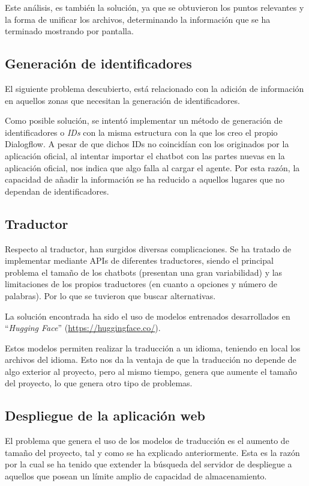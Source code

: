 Este análisis, es también la solución, ya que se obtuvieron los puntos relevantes y la forma de unificar los archivos, determinando la información que se ha terminado mostrando por pantalla.

\subsection{Generación de identificadores}
El siguiente problema descubierto, está relacionado con la adición de información en aquellos zonas que necesitan la generación de identificadores. 

Como posible solución, se intentó implementar un método de generación de identificadores o \textit{IDs} con la misma estructura con la que los creo el propio Dialogflow. A pesar de que dichos IDs no coincidían con los originados por la aplicación oficial, al intentar importar el chatbot con las partes nuevas en la aplicación oficial, nos indica que algo falla al cargar el agente. Por esta razón, la capacidad de añadir la información se ha reducido a aquellos lugares que no dependan de identificadores.

\subsection{Traductor}
Respecto al traductor, han surgidos diversas complicaciones. Se ha tratado de implementar mediante APIs de diferentes traductores, siendo el principal problema el tamaño de los chatbots (presentan una gran variabilidad) y las limitaciones de los propios traductores (en cuanto a opciones y número de palabras). Por lo que se tuvieron que buscar alternativas.

La solución encontrada ha sido el uso de modelos entrenados desarrollados en ``\textit{Hugging Face}'' \cite{ModelsHu68:online} (\url{https://huggingface.co/}).

Estos modelos permiten realizar la traducción a un idioma, teniendo en local los archivos del idioma. Esto nos da la ventaja de que la traducción no depende de algo exterior al proyecto, pero al mismo tiempo, genera que aumente el tamaño del proyecto, lo que genera otro tipo de problemas.

\subsection{Despliegue de la aplicación web}
El problema que genera el uso de los modelos de traducción es el aumento de tamaño del proyecto, tal y como se ha explicado anteriormente. Esta es la razón por la cual se ha tenido que extender la búsqueda del servidor de despliegue a aquellos que posean un límite amplio de capacidad de almacenamiento.

